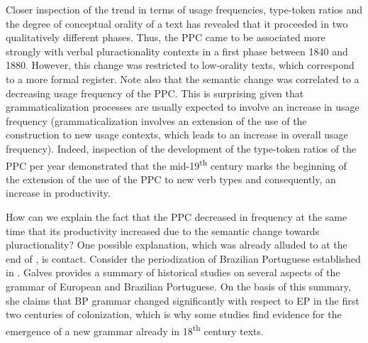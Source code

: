 \documentclass[output=paper,colorlinks,citecolor=brown]{langscibook}
\begin{document}
Closer inspection of the trend in terms of usage frequencies, type-token ratios and the degree of conceptual orality of a text has revealed that it proceeded in two qualitatively different phases. Thus, the PPC came to be associated more strongly with verbal pluractionality contexts in a first phase between 1840 and 1880. However, this change was restricted to low-orality texts, which correspond to a more formal register. Note also that the semantic change was correlated to a decreasing usage frequency of the PPC. This is surprising given that grammaticalization processes are usually expected to involve an increase in usage frequency (grammaticalization involves an extension of the use of the construction to new usage contexts, which leads to an increase in overall usage frequency). Indeed, inspection of the development of the type-token ratios of the PPC per year demonstrated that the mid-19\textsuperscript{th} century marks the beginning of the extension of the use of the PPC to new verb types and consequently, an increase in productivity.

How can we explain the fact that the PPC decreased in frequency at the same time that its productivity increased due to the semantic change towards pluractionality? One possible explanation, which was already alluded to at the end of , is contact. Consider the periodization of Brazilian Portuguese established in \citet{Galves2007}. Galves provides a summary of historical studies on several aspects of the grammar of European and Brazilian Portuguese. On the basis of this summary, she claims that BP grammar changed significantly with respect to EP in the first two centuries of colonization, which is why some studies find evidence for the emergence of a new grammar already in 18\textsuperscript{th} century texts.\largerpage
\end{document}
